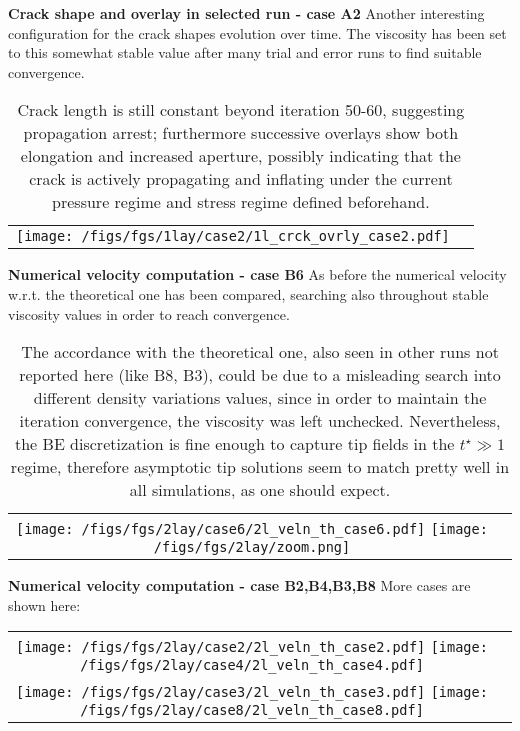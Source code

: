 \documentclass[9pt]{beamer}
\begin{document}
\begin{frame}{\textbf{Crack shape and overlay in selected run - case A2}}
Another interesting configuration for the crack shapes evolution over time. The viscosity has been set to this somewhat stable value after many trial and error runs to find suitable convergence.
\begin{table}
    \centering
    \begin{tabular}{cc}
        \texttt{[image: /figs/fgs/1lay/case2/1l\_crck\_ovrly\_case2.pdf]}
    \end{tabular}
  \caption{Crack length is still constant beyond iteration 50-60, suggesting propagation arrest; furthermore successive overlays show both elongation and increased aperture, possibly indicating that the crack is actively propagating and inflating under the current pressure regime and stress regime defined beforehand. }
\end{table}
\end{frame}

\begin{frame}{\textbf{Numerical velocity computation - case B6}}
As before the numerical velocity w.r.t. the theoretical one has been compared, searching also throughout stable viscosity values in order to reach convergence.
\begin{table}
    \centering
    \begin{tabular}{cc}
        \texttt{[image: /figs/fgs/2lay/case6/2l\_veln\_th\_case6.pdf]}
        \texttt{[image: /figs/fgs/2lay/zoom.png]}
    \end{tabular}
  \caption{The accordance with the theoretical one, also seen in other runs not reported here (like B8, B3), could be due to a misleading search into different density variations values, since in order to maintain the iteration convergence, the viscosity was left unchecked. Nevertheless, the BE discretization is fine enough to capture tip fields in the $t^{\star} \gg 1$ regime, therefore asymptotic tip solutions seem to match pretty well in all simulations, as one should expect.}
\end{table}
\end{frame}

\begin{frame}{\textbf{Numerical velocity computation - case B2,B4,B3,B8}}
More cases are shown here:
\begin{table}
    \centering
    \begin{tabular}{cc}
        \texttt{[image: /figs/fgs/2lay/case2/2l\_veln\_th\_case2.pdf]}
        \texttt{[image: /figs/fgs/2lay/case4/2l\_veln\_th\_case4.pdf]}\\
        \texttt{[image: /figs/fgs/2lay/case3/2l\_veln\_th\_case3.pdf]}
        \texttt{[image: /figs/fgs/2lay/case8/2l\_veln\_th\_case8.pdf]}
    \end{tabular}
\end{table}
\end{frame}
\end{document}

